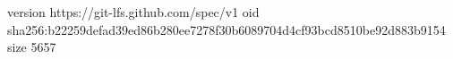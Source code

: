 version https://git-lfs.github.com/spec/v1
oid sha256:b22259defad39ed86b280ee7278f30b6089704d4cf93bcd8510be92d883b9154
size 5657
